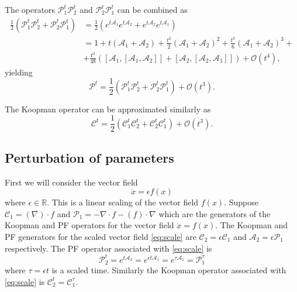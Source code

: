 \documentclass[pdflatex,sn-mathphys]{sn-jnl}%
\renewcommand{\P}{\mathcal{P}}
\newcommand{\A}{\mathcal{A}}
\newcommand{\C}{\mathcal{C}}
\theoremstyle{thmstyleone}%
\theoremstyle{thmstyletwo}%
\theoremstyle{thmstylethree}%
\begin{document}
The operators $\mathcal{P}^t_1\mathcal{P}^t_2$ and $\mathcal{P}^t_2\mathcal{P}^t_1$ can be combined as
\begin{equation}
\begin{split}
\frac{1}{2}\left(\mathcal{P}^t_1\mathcal{P}^t_2 + \mathcal{P}^t_2\mathcal{P}^t_1 \right) &= \frac{1}{2}\left(e^{t\mathcal{A}_1}e^{t\mathcal{A}_2} + e^{t\mathcal{A}_2}e^{t\mathcal{A}_1}\right) \\
&=1 + t(\mathcal{A}_1+\mathcal{A}_2) + \frac{t^2}{2}\left( \mathcal{A}_1+\mathcal{A}_2\right)^2 + \frac{t^3}{6}\left(\mathcal{A}_1+\mathcal{A}_2\right)^3+ \\
&+\frac{t^3}{48}\left([\mathcal{A}_1, [\mathcal{A}_1,\mathcal{A}_2]] + [\mathcal{A}_2, [\mathcal{A}_2,\mathcal{A}_1]]\right) + \mathcal{O}(t^4),
\end{split}
\end{equation}
yielding
\begin{equation} \label{eq:P_cubic}
   \mathcal{P}^t =\frac{1}{2}\left(\mathcal{P}^t_1\mathcal{P}^t_2 + \mathcal{P}^t_2\mathcal{P}^t_1 \right)  + \mathcal{O}(t^3).
\end{equation}

The Koopman operator can be approximated similarly as
\begin{equation}\label{eq:K_cubic}
    \mathcal{C}^t = \frac{1}{2}\left(\mathcal{C}^t_1\mathcal{C}^t_2 + \mathcal{C}^t_2\mathcal{C}^t_1 \right)  + \mathcal{O}(t^3).
\end{equation}

\subsection{Perturbation of parameters}\label{sec:params}

First we will consider the vector field
\begin{equation}\label{eq:scale}
\dot{x} = \epsilon f(x)
\end{equation}
where $\epsilon \in \mathbb{R}$. This is a linear scaling of the vector field $f(x)$. Suppose  $\C_1 = (\nabla)\cdot f$ and $\P_1 = -\nabla \cdot f - (f) \cdot \nabla$ which are the generators of the Koopman and PF operators for the vector field $\dot{x} = f(x)$. The Koopman and PF generators for the scaled vector field \eqref{eq:scale} are $\C_2 = \epsilon\C_1$ and $\A_2 = \epsilon \P_1$ respectively.
The PF operator associated with \eqref{eq:scale} is
\begin{equation}
    \P_2^t = e^{t\A_2} = e^{\epsilon t\A_1} = e^{\tau \A_1} = \P_1^\tau
\end{equation}
where $\tau = \epsilon t$ is a scaled time. Similarly the Koopman operator associated with \eqref{eq:scale} is $\C_2^t = \C_1^\tau$.
\end{document}
